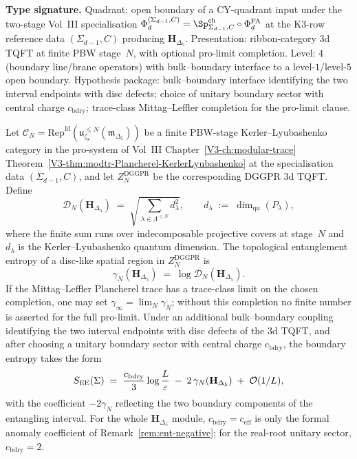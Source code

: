 \begin{theorem}
\label{thm:ent-topological-entanglement}
\ClaimStatusConditional
\textbf{Type signature.}  Quadrant: open boundary of a CY-quadrant
input under the two-stage Vol~III specialisation
$\Phi_d^{(\Sigma_{d-1},C)}=\Sp^{\mathrm{ch}}_{\Sigma_{d-1},C}\circ
\Phi_d^{\mathrm{FA}}$ at the K3-row reference data $(\Sigma_{d-1},C)$
producing $\mathbf H_{\Delta_5}$.  Presentation: ribbon-category 3d
TQFT at finite PBW stage~$N$, with optional pro-limit completion.
Level: $4$ (boundary line/brane operators) with bulk--boundary
interface to a level-$1$/level-$5$ open boundary.  Hypothesis
package: bulk--boundary interface identifying the two interval
endpoints with disc defects; choice of unitary boundary sector with
central charge $c_{\mathrm{bdry}}$; trace-class Mittag--Leffler
completion for the pro-limit clause.

Let $\mathcal C_N =
\mathrm{Rep}^{\mathrm{fd}}(\mathfrak u_{\zeta_8}^{\le N}
(\widehat{\mathfrak m}_{\Delta_5}))$ be a finite PBW-stage
Kerler--Lyubashenko category in the pro-system of
Vol~III Chapter~\ref{V3-ch:modular-trace}
Theorem~\ref{V3-thm:modtr-Plancherel-KerlerLyubashenko} at the
specialisation data $(\Sigma_{d-1},C)$, and let
$Z_N^{\mathrm{DGGPR}}$ be the corresponding DGGPR 3d TQFT.  Define
\[
 \mathcal D_N(\mathbf H_{\Delta_5})
 \;=\;
 \sqrt{\sum_{\lambda\in\Lambda^{\le N}}d_\lambda^2},
 \qquad
 d_\lambda
 \;:=\;
 \dim_{\mathrm{qu}}(P_\lambda),
\]
where the finite sum runs over indecomposable projective covers at
stage~$N$ and $d_\lambda$ is the Kerler--Lyubashenko quantum
dimension.  The topological entanglement entropy of a disc-like
spatial region in $Z_N^{\mathrm{DGGPR}}$ is
\[
 \boxed{\;
 \gamma_N(\mathbf H_{\Delta_5})
 \;=\;
 \log\mathcal D_N(\mathbf H_{\Delta_5}).\;}
\]
If the Mittag--Leffler Plancherel trace has a trace-class limit on the
chosen completion, one may set
$\gamma_\infty=\lim_N\gamma_N$; without this completion no finite
number is asserted for the full pro-limit.  Under an additional
bulk--boundary coupling identifying the two interval endpoints with
disc defects of the 3d TQFT, and after choosing a unitary boundary
sector with central charge $c_{\mathrm{bdry}}$, the boundary entropy
takes the form
\[
 S_{\mathrm{EE}}(\Sigma)
 \;=\;
 \frac{c_{\mathrm{bdry}}}{3}\log\frac{L}{\varepsilon}
 \;-\;
 2\,\gamma_N(\mathbf H_{\Delta_5})
 \;+\;
 \mathcal O(1/L),
\]
with the coefficient $-2\gamma_N$ reflecting the two boundary
components of the entangling interval.  For the whole
$\mathbf H_{\Delta_5}$ module, $c_{\mathrm{bdry}}=c_{\mathrm{eff}}$
is only the formal anomaly coefficient of
Remark~\ref{rem:ent-negative}; for the real-root unitary sector,
$c_{\mathrm{bdry}}=2$.
\end{theorem}

